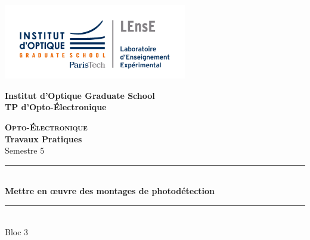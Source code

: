 \documentclass[a4paper,11pt]{article} %
\begin{document}
\begin{titlepage}

\begin{center}
	\begin{minipage}{2.5cm}
	\begin{center}
		\includegraphics[width=8cm]{images/Logo-LEnsE.png}
	\end{center}
\end{minipage}\hfill
\begin{minipage}{10cm}
	\begin{center}
	\textbf{Institut d'Optique Graduate School }\\[0.1cm]
    \textbf{TP d'Opto-Électronique}


	\end{center}
\end{minipage}\hfill


\vspace{5cm}


{\huge \bfseries \textsc{Opto-Électronique}} \\[0.5cm]
{\large \bfseries Travaux Pratiques} \\[0.2cm]
Semestre 5

\vspace{2cm}
\rule{\linewidth}{0.3mm} \\[0.4cm]
{ \huge \bfseries\color{violet_iogs} Mettre en \oe{}uvre des montages de photodétection \\[0.4cm] }
\rule{\linewidth}{0.3mm} \\[1cm]
{\huge Bloc 3}

\vfill


\end{center}
\end{titlepage}

\newpage
\strut %
\newpage
\pagestyle{empty}
\end{document}
